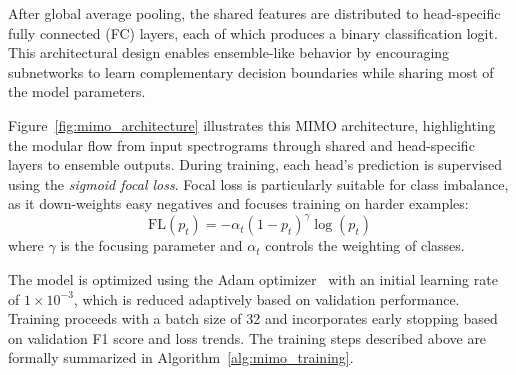 After global average pooling, the shared features are distributed to head-specific fully connected (FC) layers, each of which produces a binary classification logit. This architectural design enables ensemble-like behavior by encouraging subnetworks to learn complementary decision boundaries while sharing most of the model parameters.

Figure~\ref{fig:mimo_architecture} illustrates this MIMO architecture, highlighting the modular flow from input spectrograms through shared and head-specific layers to ensemble outputs. During training, each head's prediction is supervised using the \textit{sigmoid focal loss}. Focal loss is particularly suitable for class imbalance, as it down-weights easy negatives and focuses training on harder examples:
\begin{equation}
\text{FL}(p_t) = -\alpha_t (1 - p_t)^{\gamma} \log(p_t)
\end{equation}
where \( \gamma \) is the focusing parameter and \( \alpha_t \) controls the weighting of classes.

The model is optimized using the Adam optimizer~\cite{adamOptimizer} with an initial learning rate of $1 \times 10^{-3}$, which is reduced adaptively based on validation performance. Training proceeds with a batch size of 32 and incorporates early stopping based on validation F1 score and loss trends. The training steps described above are formally summarized in Algorithm~\ref{alg:mimo_training}.

